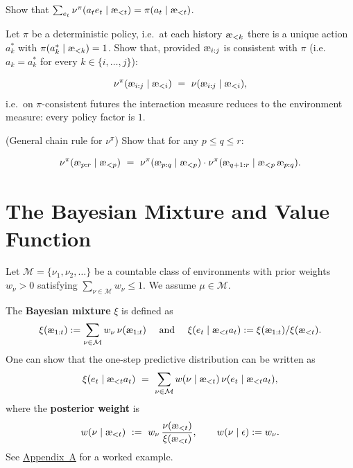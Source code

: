 \documentclass[fontsize=11pt, parskip=half]{scrartcl}
\newcommand{\cM}{\mathcal{M}}
\newcommand{\aes}{\textnormal{\ae}}
\begin{document}
\begin{exercise}
\label{prob:marginal_percepts}
\skippable
Show that $\sum_{e_t} \nu^\pi(a_t e_t \mid \aes_{<t}) = \pi(a_t \mid \aes_{<t})$.

\end{exercise}


\begin{exercise}
\label{prob:det_interaction}
\skippable
Let $\pi$ be a deterministic policy, i.e.\ at each history $\aes_{<k}$ there is a unique action $a^*_k$ with $\pi(a^*_k \mid \aes_{<k}) = 1$.
Show that, provided $\aes_{i:j}$ is consistent with $\pi$ (i.e.\ $a_k = a^*_k$ for every $k \in \{i, \ldots, j\}$):

\[
    \nu^\pi(\aes_{i:j} \mid \aes_{<i}) ~=~ \nu(\aes_{i:j} \mid \aes_{<i}),
\]
i.e.\ on $\pi$-consistent futures the interaction measure reduces to the environment measure: every policy factor is $1$.
\end{exercise}


\begin{exercise}
\label{prob:chain_rule_nupi}
(General chain rule for $\nu^\pi$)
Show that for any $p \leq q \leq r$:

\[
    \nu^\pi(\aes_{p:r} \mid \aes_{<p}) ~=~ \nu^\pi(\aes_{p:q} \mid \aes_{<p}) \cdot \nu^\pi(\aes_{q+1:r} \mid \aes_{<p}\, \aes_{p:q}).
\]
\end{exercise}



\section*{The Bayesian Mixture and Value Function}

\begin{definition}\label{def:mixture}
Let $\cM = \{\nu_1, \nu_2, \ldots\}$ be a countable class of environments with prior weights $w_\nu > 0$ satisfying $\sum_{\nu \in \cM} w_\nu \leq 1$.
We assume $\mu \in \cM$.

The \textbf{Bayesian mixture} $\xi$ is defined as 
$$
\xi(\aes_{1:t}) := \sum_{\nu \in \cM} w_\nu\, \nu(\aes_{1:t}) \quad \text{ and } \quad \xi(e_t \mid \aes_{<t} a_t) := \xi(\aes_{1:t}) / \xi(\aes_{<t}).
$$
One can show that the one-step predictive distribution can be written as
\[
    \xi(e_t \mid \aes_{<t} a_t)
    ~=~ \sum_{\nu \in \cM} w(\nu \mid \aes_{<t})\, \nu(e_t \mid \aes_{<t} a_t),
\]
where the \textbf{posterior weight} is
\[
    w(\nu \mid \aes_{<t})
    ~:=~ w_\nu \,\frac{\nu(\aes_{<t})}{\xi(\aes_{<t})},
    \qquad w(\nu \mid \epsilon) := w_\nu.
\]
See \hyperref[sec:appendix_mixture]{Appendix~A} for a worked example.
\end{definition}
\end{document}
